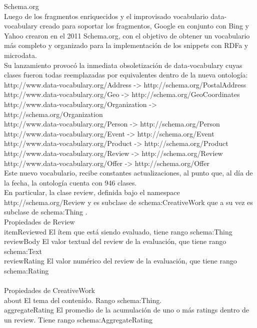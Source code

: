 Schema.org\\
Luego de los fragmentos enriquecidos y el improvisado vocabulario data-vocabulary creado para soportar los fragmentos, Google 
en conjunto con Bing y Yahoo crearon en el 2011 Schema.org, con el objetivo de obtener un vocabulario más completo y 
organizado para la implementación de los snippets con RDFa y microdata.\\
Su lanzamiento provocó la inmediata obsoletización de data-vocabulary cuyas clases fueron todas reemplazadas por equivalentes 
dentro de la nueva ontología:\\
http://www.data-vocabulary.org/Address -> http://schema.org/PostalAddress\\
http://www.data-vocabulary.org/Geo -> http://schema.org/GeoCoordinates\\
http://www.data-vocabulary.org/Organization -> http://schema.org/Organization\\
http://www.data-vocabulary.org/Person -> http://schema.org/Person\\
http://www.data-vocabulary.org/Event -> http://schema.org/Event\\
http://www.data-vocabulary.org/Product -> http://schema.org/Product\\
http://www.data-vocabulary.org/Review -> http://schema.org/Review\\
http://www.data-vocabulary.org/Offer -> http://schema.org/Offer\\
Este nuevo vocabulario, recibe constantes actualizaciones, al punto que, al día de la fecha, la ontología cuenta con 946 clases. \\
En particular, la clase review, definida bajo el namespace http://schema.org/Review y es subclase de schema:CreativeWork 
que a su vez es subclase de schema:Thing .\\
Propiedades de Review\\
itemReviewed 	El ítem que está siendo evaluado, tiene rango schema:Thing \\
reviewBody 	El valor textual del review de la evaluación, que tiene rango schema:Text \\
reviewRating 	El valor numérico del review de la evaluación, que tiene rango schema:Rating \\
\\Propiedades de CreativeWork \\
about 	El tema del contenido. Rango schema:Thing. \\
aggregateRating 	El promedio de la acumulación de uno o más ratings dentro de un review. Tiene rango schema:AggregateRating \\
